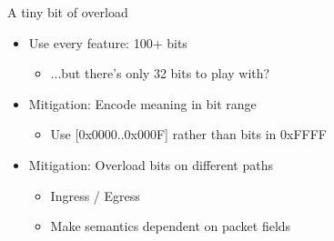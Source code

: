 \documentclass[black,white,aspectratio=169]{beamer}
\DeclareRobustCommand{\#}{\adjustbox{valign=B,totalheight=.57\baselineskip}{\oldhash}}%
\begin{document}
    \begin{frame}{A tiny bit of overload}
        \begin{itemize}
            \item Use every feature: 100+ bits~\smallskip
            \begin{itemize}
                \item ...but there's only 32 bits to play with?~\smallskip
            \end{itemize}
            \item Mitigation: Encode meaning in bit range~\smallskip
            \begin{itemize}
                \item Use [0x0000..0x000F] rather than bits in 0xFFFF~\medskip
            \end{itemize}
            \item Mitigation: Overload bits on different paths~\smallskip
            \begin{itemize}
                \item Ingress / Egress~\smallskip
                \item Make semantics dependent on packet fields~\medskip
            \end{itemize}
        \end{itemize}
    \end{frame}
\end{document}
